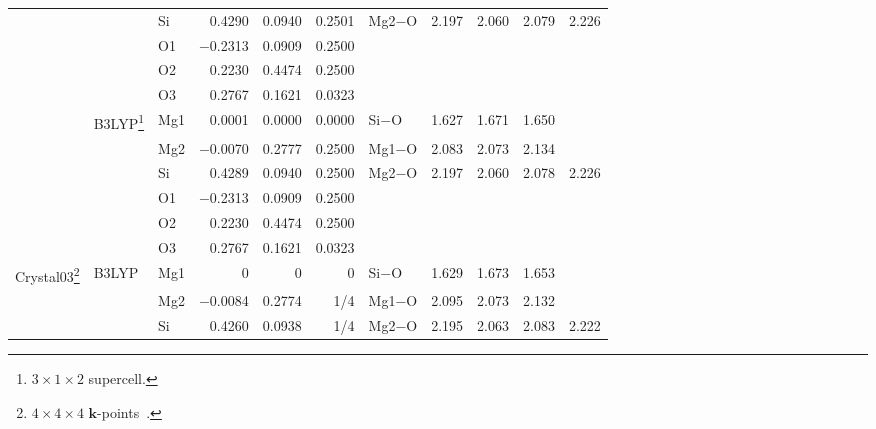 \documentclass[pra,twocolumn,twocolumngrid,superbib]{revtex4} %
\begin{document}
\begin{table}[t]
\begin{tabular}{lllrrrlcccc}
    &        & Si  &    0.4290 & 0.0940 & 0.2501 & Mg2$-$O & 2.197 & 2.060 & 2.079 & 2.226 \\%
    &        & O1  & $-$0.2313 & 0.0909 & 0.2500 &         &       &       &       & \\%
    &        & O2  &    0.2230 & 0.4474 & 0.2500 &         &       &       &       & \\%
    &        & O3  &    0.2767 & 0.1621 & 0.0323 &         &       &       &       & \\%
    & B3LYP\footnote[3]{$3\times 1\times 2$ supercell.} %
             & Mg1 &    0.0001 & 0.0000 & 0.0000 & Si$-$O  & 1.627 & 1.671 & 1.650 & \\%
    &        & Mg2 & $-$0.0070 & 0.2777 & 0.2500 & Mg1$-$O & 2.083 & 2.073 & 2.134 & \\%
    &        & Si  &    0.4289 & 0.0940 & 0.2500 & Mg2$-$O & 2.197 & 2.060 & 2.078 & 2.226\\%
    &        & O1  & $-$0.2313 & 0.0909 & 0.2500 &         &       &       &       & \\%
    &        & O2  &    0.2230 & 0.4474 & 0.2500 &         &       &       &       & \\%
    &        & O3  &    0.2767 & 0.1621 & 0.0323 &         &       &       &       & \\%
  \hline
    {\sc Crystal03}\footnote[4]{$4\times 4\times 4$ $\mathbf{k}$-points~\cite{YNoel06}.}
    & B3LYP & Mg1 &    0      & 0      & 0      & Si$-$O  & 1.629 & 1.673 & 1.653 & \\%
    &       & Mg2 & $-$0.0084 & 0.2774 & 1/4    & Mg1$-$O & 2.095 & 2.073 & 2.132 & \\%
    &       & Si  &    0.4260 & 0.0938 & 1/4    & Mg2$-$O & 2.195 & 2.063 & 2.083 & 2.222 \\%

\end{tabular}
\end{table}
\end{document}
